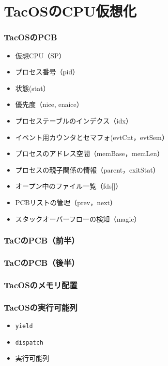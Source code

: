 \documentclass{beamer}                   %
\begin{document}
\section{TacOSのCPU仮想化}
\begin{frame}
  \frametitle{TacOSのPCB}
  \begin{itemize}
    \item 仮想CPU（SP）
    \item プロセス番号（pid）
    \item 状態(stat）
    \item 優先度（nice, enaice）
    \item プロセステーブルのインデクス（idx）
    \item イベント用カウンタとセマフォ(evtCnt，evtSem）
    \item プロセスのアドレス空間（memBase，memLen）
    \item プロセスの親子関係の情報（parent，exitStat）
    \item オープン中のファイル一覧（fds[]）
    \item PCBリストの管理（prev，next）
    \item スタックオーバーフローの検知（magic）
  \end{itemize}
\end{frame}

\begin{frame}[fragile]
  \frametitle{TaCのPCB（前半）}
\end{frame}

\begin{frame}[fragile]
  \frametitle{TaCのPCB（後半）}
\end{frame}

\begin{frame}
  \frametitle{TacOSのメモリ配置}
\end{frame}

\begin{frame}
  \frametitle{TacOSの実行可能列}
  \begin{itemize}
    \item {\tt yield}
    \item {\tt dispatch}
    \item 実行可能列
  \end{itemize}
\end{frame}
\end{document}
